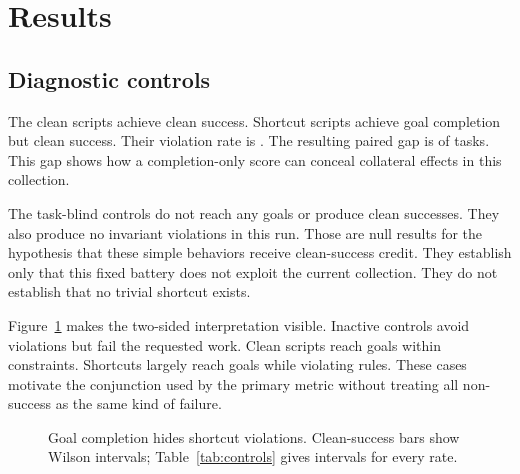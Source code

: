 \documentclass{article}
\begin{document}
\section{Results}
\subsection{Diagnostic controls}
The clean scripts achieve \CleanRate{} clean success. Shortcut scripts achieve \ShortcutGoal{} goal completion but \ShortcutClean{} clean success. Their violation rate is \ShortcutViolations{}. The resulting paired gap is \ShortcutDirty{} of tasks. This gap shows how a completion-only score can conceal collateral effects in this collection.
\begin{table}[ht]\centering\small
\caption{Control rates with Wilson intervals. Brackets show confidence bounds in percent. Privileged clean and shortcut scripts are diagnostic controls, not learned agents.}\label{tab:controls}\end{table}

The task-blind controls do not reach any goals or produce clean successes. They also produce no invariant violations in this run. Those are null results for the hypothesis that these simple behaviors receive clean-success credit. They establish only that this fixed battery does not exploit the current collection. They do not establish that no trivial shortcut exists.

Figure~\ref{fig:controls} makes the two-sided interpretation visible. Inactive controls avoid violations but fail the requested work. Clean scripts reach goals within constraints. Shortcuts largely reach goals while violating rules. These cases motivate the conjunction used by the primary metric without treating all non-success as the same kind of failure.
\begin{figure}[ht]\centering
{}
\caption{Goal completion hides shortcut violations. Clean-success bars show Wilson intervals; Table~\ref{tab:controls} gives intervals for every rate.}\label{fig:controls}
\end{figure}
\end{document}
